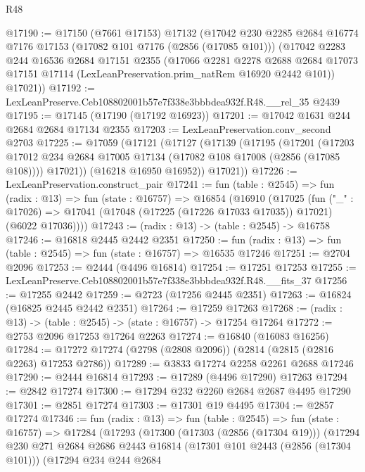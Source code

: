 \begin{lexlean}{R48}
\begin{coremodule}
@17190 := @17150
    (@7661 @17153)
    @17132
    (@17042
      @230
      @2285
      @2684
      @16774
      @7176
      @17153
      (@17082 @101 @7176 (@2856 (@17085 @101)))
      (@17042
        @2283
        @244
        @16536
        @2684
        @17151
        @2355
        (@17066
          @2281
          @2278
          @2688
          @2684
          @17073
          @17151
          @17114
          (LexLeanPreservation.prim_natRem @16920 @2442 @101))
        @17021))
@17192 := LexLeanPreserve.Ceb108802001b57e7f338e3bbbdea932f.R48.__rel_35 @2439
@17195 := @17145 (@17190 (@17192 @16923))
@17201 := @17042 @1631 @244 @2684 @2684 @17134 @2355
@17203 := LexLeanPreservation.conv_second @2703
@17225 := @17059
    (@17121
      (@17127
        (@17139
          (@17195
            (@17201
              (@17203 @17012 @234 @2684 @17005 @17134 (@17082 @108 @17008 (@2856 (@17085 @108))))
              @17021))
          (@16218 @16950 @16952))
        @17021))
@17226 := LexLeanPreservation.construct_pair
@17241 := fun (table : @2545) =>
  fun (radix : @13) =>
  fun (state : @16757) =>
  @16854
    (@16910
      (@17025
        (fun ("_" : @17026) =>
        @17041 (@17048 (@17225 (@17226 @17033 @17035)) @17021) (@6022 @17036))))
@17243 := (radix : @13) -> (table : @2545) -> @16758
@17246 := @16818 @2445 @2442 @2351
@17250 := fun (radix : @13) => fun (table : @2545) => fun (state : @16757) => @16535 @17246
@17251 := @2704 @2096
@17253 := @2444 (@4496 @16814)
@17254 := @17251 @17253
@17255 := LexLeanPreserve.Ceb108802001b57e7f338e3bbbdea932f.R48.__fits_37
@17256 := @17255 @2442
@17259 := @2723 (@17256 @2445 @2351)
@17263 := @16824 (@16825 @2445 @2442 @2351)
@17264 := @17259 @17263
@17268 := (radix : @13) -> (table : @2545) -> (state : @16757) -> @17254 @17264
@17272 := @2753 @2096 @17253 @17264 @2263
@17274 := @16840 (@16083 @16256)
@17284 := @17272 @17274 (@2798 (@2808 @2096)) (@2814 (@2815 (@2816 @2263) @17253 @2786))
@17289 := @3833 @17274 @2258 @2261 @2688 @17246
@17290 := @2444 @16814
@17293 := @17289 (@4496 @17290) @17263
@17294 := @2842 @17274
@17300 := @17294 @232 @2260 @2684 @2687 @4495 @17290
@17301 := @2851 @17274
@17303 := @17301 @19 @4495
@17304 := @2857 @17274
@17346 := fun (radix : @13) =>
  fun (table : @2545) =>
  fun (state : @16757) =>
  @17284
    (@17293
      (@17300
        (@17303 (@2856 (@17304 @19)))
        (@17294
          @230
          @271
          @2684
          @2686
          @2443
          @16814
          (@17301 @101 @2443 (@2856 (@17304 @101)))
          (@17294
            @234
            @244
            @2684

\end{coremodule}
\end{lexlean}
